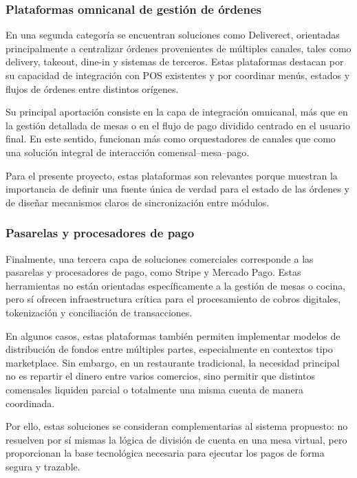 \documentclass[12pt]{report}
\begin{document}
\subsubsection{Plataformas omnicanal de gestión de órdenes}

En una segunda categoría se encuentran soluciones como Deliverect, orientadas principalmente a centralizar órdenes provenientes de múltiples canales, tales como delivery, takeout, dine-in y sistemas de terceros. Estas plataformas destacan por su capacidad de integración con POS existentes y por coordinar menús, estados y flujos de órdenes entre distintos orígenes.

Su principal aportación consiste en la capa de integración omnicanal, más que en la gestión detallada de mesas o en el flujo de pago dividido centrado en el usuario final. En este sentido, funcionan más como orquestadores de canales que como una solución integral de interacción comensal--mesa--pago.

Para el presente proyecto, estas plataformas son relevantes porque muestran la importancia de definir una fuente única de verdad para el estado de las órdenes y de diseñar mecanismos claros de sincronización entre módulos.

\subsubsection{Pasarelas y procesadores de pago}

Finalmente, una tercera capa de soluciones comerciales corresponde a las pasarelas y procesadores de pago, como Stripe y Mercado Pago. Estas herramientas no están orientadas específicamente a la gestión de mesas o cocina, pero sí ofrecen infraestructura crítica para el procesamiento de cobros digitales, tokenización y conciliación de transacciones.

En algunos casos, estas plataformas también permiten implementar modelos de distribución de fondos entre múltiples partes, especialmente en contextos tipo marketplace. Sin embargo, en un restaurante tradicional, la necesidad principal no es repartir el dinero entre varios comercios, sino permitir que distintos comensales liquiden parcial o totalmente una misma cuenta de manera coordinada.

Por ello, estas soluciones se consideran complementarias al sistema propuesto: no resuelven por sí mismas la lógica de división de cuenta en una mesa virtual, pero proporcionan la base tecnológica necesaria para ejecutar los pagos de forma segura y trazable.
\end{document}
